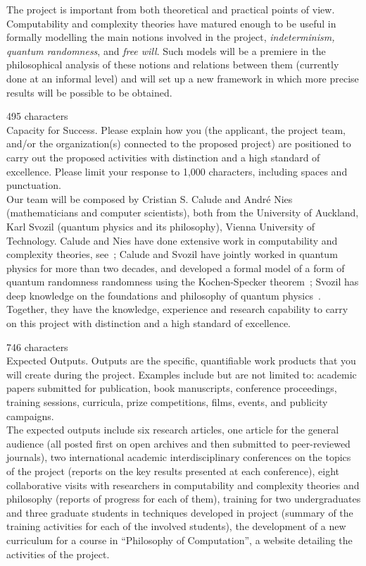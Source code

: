 \documentclass[11pt,  a4paper]{article}
\begin{document}
The project is important from both theoretical and practical points of view.
Computability and complexity theories have matured enough to be useful in formally modelling  the main notions involved in the project, {\it indeterminism, quantum randomness},  and {\it free will}. Such models will be a premiere in the philosophical analysis of these notions and relations between them (currently done at an informal level) and will set up a new framework in which
more precise results will be possible to be obtained.

 {\color{red} 495 characters}\\


{\small \color{blue} \noindent
Capacity for Success. Please explain how you (the applicant, the project team, and/or the organization(s) connected to the proposed project) are positioned to carry out the proposed activities with distinction and a high standard of excellence. Please limit your response to 1,000 characters, including spaces and punctuation.
}\\

Our team will be composed by Cristian S. Calude and Andr\'e Nies (mathematicians and computer scientists),  both from the University of Auckland,
 Karl Svozil (quantum physics and its philosophy), Vienna University of Technology.
 Calude and Nies have done extensive work in computability and complexity theories, see~\cite{8,AN}; Calude and Svozil have jointly worked  in quantum physics for more than two decades, and developed a formal model  of a form of quantum randomness randomness using the Kochen-Specker theorem~\cite{2,4}; Svozil has deep knowledge on the foundations and philosophy of quantum physics~\cite{KS}. Together, they have the knowledge, experience and research capability to carry on this project with distinction and a high standard of excellence.

 {\color{red} 746 characters}\\



{\small \color{blue} \noindent Expected Outputs. Outputs are the specific, quantifiable work products that you will create during the project. Examples include but are not limited to: academic papers submitted for publication, book manuscripts, conference proceedings, training sessions, curricula, prize competitions, films, events, and publicity campaigns.}\\

 The expected outputs include six research articles, one article for the general audience
 (all posted first on open archives and then submitted to peer-reviewed journals), two  international academic interdisciplinary conferences on the topics of the project (reports on the key results presented at each conference), eight collaborative visits with researchers in computability and complexity theories and philosophy (reports of progress for each of them), training for  two undergraduates and three graduate students in techniques developed in project (summary of the training activities for each of the involved students), the development of a new curriculum for a course in ``Philosophy of Computation'', a   website detailing the  activities of the project.
\end{document}
